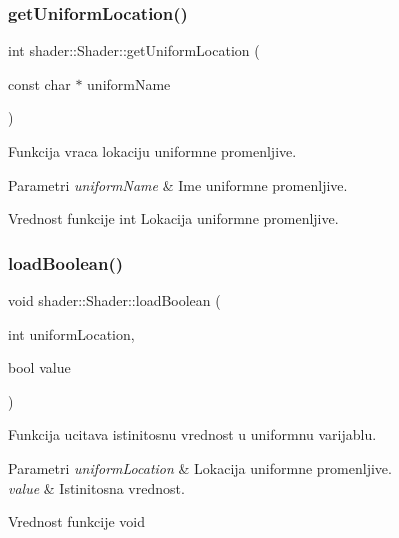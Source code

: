 \subsubsection{\texorpdfstring{get\+Uniform\+Location()}{getUniformLocation()}}
{\footnotesize\ttfamily int shader\+::\+Shader\+::get\+Uniform\+Location (\begin{DoxyParamCaption}\item[{const char $\ast$}]{uniform\+Name }\end{DoxyParamCaption})}



Funkcija vraca lokaciju uniformne promenljive. 


\begin{DoxyParams}{Parametri}
{\em uniform\+Name} & Ime uniformne promenljive. \\
\hline
\end{DoxyParams}
\begin{DoxyReturn}{Vrednost funkcije}
int Lokacija uniformne promenljive. 
\end{DoxyReturn}
\mbox{\label{classshader_1_1Shader_acb1ec74c8d2ad5218669ece88a6dd491}} 
\subsubsection{\texorpdfstring{load\+Boolean()}{loadBoolean()}}
{\footnotesize\ttfamily void shader\+::\+Shader\+::load\+Boolean (\begin{DoxyParamCaption}\item[{int}]{uniform\+Location,  }\item[{bool}]{value }\end{DoxyParamCaption})}



Funkcija ucitava istinitosnu vrednost u uniformnu varijablu. 


\begin{DoxyParams}{Parametri}
{\em uniform\+Location} & Lokacija uniformne promenljive. \\
\hline
{\em value} & Istinitosna vrednost. \\
\hline
\end{DoxyParams}
\begin{DoxyReturn}{Vrednost funkcije}
void 
\end{DoxyReturn}
\mbox{\label{classshader_1_1Shader_a124ef086687ad7bcb0050c9fd1b13a24}} 
